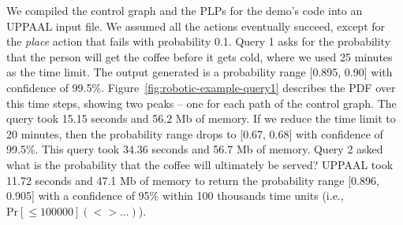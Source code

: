 \documentclass[letterpaper]{article}
\begin{document}



We compiled the control graph and the PLPs for the demo's code into an UPPAAL input file.
We assumed all the actions eventually succeed, except for the {\em place} action that fails with probability 0.1.
Query 1 asks for the probability that the person will get the coffee before it gets cold, where we used 25 minutes as the time limit. %
The output generated is a probability range [0.895, 0.90] with confidence of 99.5\%.  Figure~\ref{fig:robotic-example-query1} describes the PDF over this time steps, showing two peaks -- one for each path of the control graph.
The query took 15.15 seconds and 56.2 Mb of memory.
If we reduce the time limit to 20 minutes, then the probability range drops to [0.67, 0.68] with confidence of 99.5\%.
This query took 34.36 seconds and 56.7 Mb of memory.
Query 2 asked what is the probability that the coffee will ultimately be served? %
UPPAAL took 11.72 seconds and 47.1 Mb of memory to return the probability range [0.896, 0.905] with a confidence of 95\% within 100 thousands time units (i.e., $\mathrm{Pr[\leq 100000] (<> ...)}$).
\end{document}
